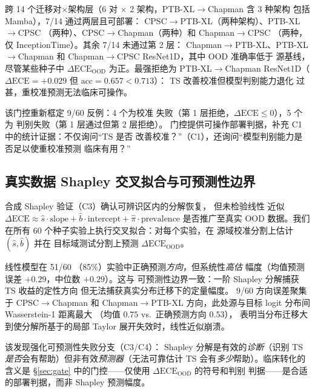 跨 14 个迁移对$\times$架构层（6 对 $\times$ 2
架构，PTB-XL$\rightarrow$Chapman 含 3 种架构
包括 Mamba），7/14 通过两层且可部署：
CPSC$\rightarrow$PTB-XL（两种架构）、PTB-XL$\rightarrow$CPSC
（两种）、CPSC$\rightarrow$Chapman（两种）和 Chapman$\rightarrow$CPSC
（两种，仅 InceptionTime）。其余 7/14 未通过第 2 层：
Chapman$\rightarrow$PTB-XL、PTB-XL$\rightarrow$Chapman 和
Chapman$\rightarrow$CPSC ResNet1D，其中 OOD 准确率低于
源基线，尽管某些种子中 $\Delta\text{ECE}_{\text{OOD}}$ 为正。最强拒绝为 PTB-XL$\rightarrow$Chapman
ResNet1D（$\Delta\text{ECE}=+0.029$ 但 $\text{acc}=0.657 < 0.713$）：
TS 改善校准但模型判别能力退化
过甚，重校准预测无法临床可操作。

该门控重新框定 9/60 反例：4 个为校准
失败（第 1 层拒绝，$\Delta\text{ECE} \leq 0$），5 个为
判别失败（第 1 层通过但第 2 层拒绝）。
门控提供可操作部署判据，补充
C1 中的统计证据：不仅询问``TS 是否
改善校准？''（C1），还询问``模型判别能力是否足以使重校准预测
临床有用？''

\subsection{真实数据 Shapley 交叉拟合与可预测性边界}
\label{sec:real_shapley}
合成 Shapley 验证（C3）确认可辨识区内的分解恢复，
但未检验线性
近似 $\Delta\text{ECE} \approx \hat{s} \cdot \text{slope} +
\hat{b} \cdot \text{intercept} + \hat{\pi} \cdot \text{prevalence}$
是否推广至真实 OOD 数据。我们在所有 60
个种子实验上执行交叉拟合：对每个实验，在
源域校准分割上估计 $(\hat{s}, \hat{b})$ 并在
目标域测试分割上预测
$\Delta\text{ECE}_{\text{OOD}}$。

线性模型在 51/60
（85\%）实验中正确预测\emph{方向}，但系统性\emph{高估}
幅度（均值预测误差 $+0.29$，中位数 $+0.29$）。这与
可预测性边界一致：一阶 Shapley
分解捕获 TS 收益的定性方向
但无法捕获真实分布迁移下的定量幅度。
9/60 方向误差聚集于 CPSC$\rightarrow$Chapman
和 Chapman$\rightarrow$PTB-XL 方向，此处源与目标 logit 分布间 Wasserstein-1
距离最大
（均值 $0.75$ vs.\ 正确预测方向 $0.53$），
表明当分布迁移大到使分解所基于的局部 Taylor
展开失效时，线性近似崩溃。

该发现强化可预测性失败分支（C3/C4）：
Shapley 分解是有效的\emph{诊断}（识别
TS \emph{是否}会有帮助）但非有效\emph{预测器}（无法可靠估计
TS 会有\emph{多少}帮助）。临床转化的
含义是 \S\ref{sec:gate} 中的门控——仅使用
$\Delta\text{ECE}_{\text{OOD}}$ 的符号和判别
判据——是合适的部署判据，而非
Shapley 预测幅度。

